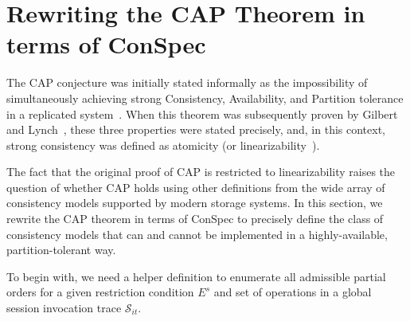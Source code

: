 \documentclass[journal,compsoc]{IEEEtran}
\begin{document}

 
\section{Rewriting the CAP Theorem in terms of ConSpec}\label{sec:cap}
The CAP conjecture was initially stated informally as the impossibility of simultaneously achieving strong Consistency, Availability, and Partition tolerance in a replicated system~\cite{brew:cap}. When this theorem was subsequently proven by Gilbert and Lynch~\cite{Gilbert:2002:BCF:564585.564601}, these three properties were stated precisely, and, in this context, strong consistency was defined as atomicity (or linearizability~\cite{Herlihy:1990:LCC:78969.78972}).

The fact that the original proof of CAP is restricted to linearizability raises the question of whether CAP holds using other definitions from
 the wide array of consistency models supported by modern storage systems.
 In this section, we rewrite the CAP theorem in terms of ConSpec to precisely define the class of consistency models that can and cannot be implemented in a highly-available, partition-tolerant way.




To begin with, we need a helper definition to enumerate all admissible partial orders for a given restriction condition $E^s$ and set of operations in a global session invocation trace $\mathcal{S}_{it}$.
\end{document}
